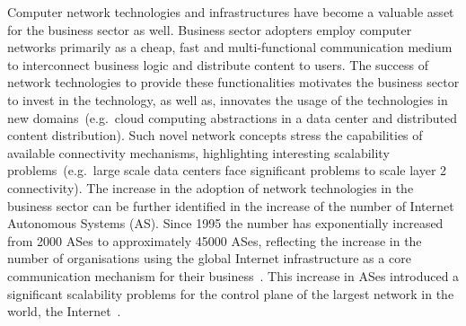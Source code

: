 
Computer network technologies and infrastructures have become a valuable asset
for the business sector as well. Business sector adopters employ computer
networks primarily as a cheap, fast and multi-functional communication medium to
interconnect business logic and distribute content to users. The success of
network technologies to provide these functionalities motivates the business
sector to invest in the technology, as well as, innovates the usage of the
technologies in new domains~(e.g.~cloud computing abstractions in a data center
and distributed content distribution). Such novel network concepts stress the
capabilities of available connectivity mechanisms, highlighting interesting
scalability problems~(e.g.~large scale data centers face significant problems to
scale layer 2 connectivity).  The increase in the adoption of network
technologies in the business sector can be further identified in the increase of
the number of Internet Autonomous Systems (AS).  Since 1995 the number has
exponentially increased from 2000 ASes to approximately 45000 ASes, reflecting
the increase in the number of organisations using the global Internet
infrastructure as a core communication mechanism for their
business~\cite{potaroo}. This increase in ASes introduced a significant
scalability problems for the control plane of the largest network in the world,
the Internet~\cite{bgp_instab_labovitz:1997}. 





